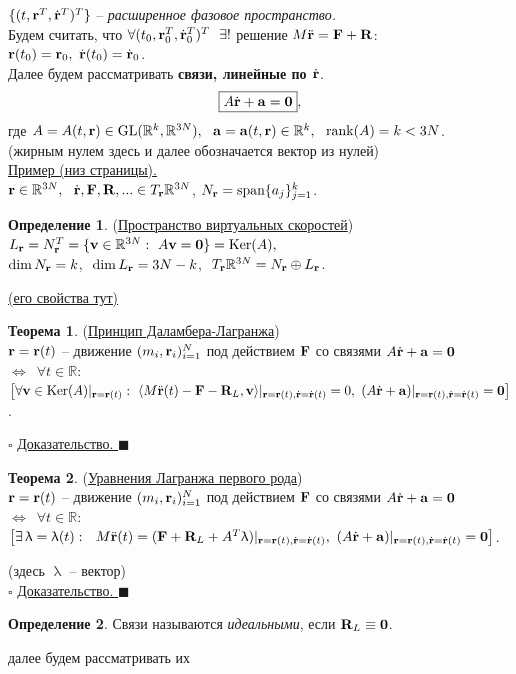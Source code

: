 \documentclass[specialist, subf, href, colorlinks=true, 12pt, times, mtpro, final]{disser}
\theoremstyle{definition}
\newtheorem{defn}{Определение}[section]
\newtheorem{theorem}{Теорема}[section]
\def\note{\textcolor{faded}}
\def\rk{\text{rank}}
\def\span{\text{span}}
\def\bfrd{\dot{\bfr}}
\def\bfrdd{\ddot{\bfr}}
\def\bfzero{\mathbf{0}}
\begin{document}
    $\{(t, \bfr^T, \bfrd^T)^T\}$ -- {\it расширенное фазовое пространство.}\\
    Будем считать, что $\forall (t_0, \bfr_0^T, \bfrd_0^T)^T \ \ \exists!$ решение
    $M\bfrdd = \bfF + \bfR$:\\ $\bfr(t_0) = \bfr_0,\ \bfrd(t_0) = \bfrd_0$.\\
    Далее будем рассматривать {\bf связи, линейные по $\bfrd$}.
    $$
    \boxed{
    A\bfrd + \bfa = \bfzero},
    $$
    где $A=A(t,\bfr)\in\text{GL}(\mathbb{R}^k, \mathbb{R}^{3N}),\ \ \bfa=\bfa(t,\bfr)\in\mathbb{R}^k,\ \ \rk(A) = k < 3N$.\\
    \note{(жирным нулем здесь и далее обозначается вектор из нулей)}\\
    \noindent\hyperlink{first_lects.2}{Пример (низ страницы).}\\
    $\bfr\in\mathbb{R}^{3N},\ \ \bfrd, \bfF, \bfR,... \in T_{\bfr}\mathbb{R}^{3N}$,
    $N_{\bfr} = \span\{a_j\}_{j=1}^k$.
    \begin{defn} (\hyperlink{first_lects.3}{Пространство виртуальных скоростей})\\
    $L_{\bfr} = N_{\bfr}^T = \{\bfv\in\mathbb{R}^{3N}:\ A\bfv=\bfzero\} = \text{Ker}(A),$\\
    $\dim N_{\mathbf{r}} = k$,\,\, $\dim L_{\mathbf{r}} = 3N-k$,\,\,  $T_{\mathbf{r}}\mathbb{R}^{3N} = N_{\mathbf{r}}\oplus L_{\mathbf{r}}$.
    \end{defn}
    \noindent\hyperlink{first_lects.3}{(его свойства тут)}
    \begin{theorem} (\hyperlink{first_lects.3}{Принцип Даламбера-Лагранжа})\\
    $\mathbf{r}=\mathbf{r}(t)$ -- движение $(m_i, \mathbf{r}_i)_{i=1}^N$ под действием $\mathbf{F}$ со
    связями $A\bfrd+\bfa=\bfzero$ $\Longleftrightarrow\,\,\,\forall t\in\mathbb{R}:\,$\\
    $\left[ \forall\bfv\in\text{Ker}(A)|_{\bfr=\bfr(t)}:\ \langle M\bfrdd(t)-\bfF-\bfR_L,\bfv\rangle
    |_{\bfr=\bfr(t),\bfrd=\bfrd(t)} = 0,\,\,(A\bfrd+\bfa)|_{\bfr=\bfr(t),\bfrd=\bfrd(t)}=\bfzero \right]$.
    \end{theorem}
    \noindent$\square$ \hyperlink{first_lects.4}{ Доказательство. } $\blacksquare$
    \begin{theorem} (\hyperlink{first_lects.5}{Уравнения Лагранжа первого рода})\\
    $\mathbf{r}=\mathbf{r}(t)$ -- движение $(m_i, \mathbf{r}_i)_{i=1}^N$ под действием $\mathbf{F}$ со
    связями $A\bfrd+\bfa=\bfzero$ $\Longleftrightarrow\,\,\,\forall t\in\mathbb{R}:\,$\\
    $\left[ \exists\,\uplambda=\uplambda(t):\ \ M\bfrdd(t)=(\bfF+\bfR_L+A^T\uplambda)|_{\bfr=\bfr(t),\bfrd=\bfrd(t)},\,\,(A\bfrd+\bfa)|_{\bfr=\bfr(t),\bfrd=\bfrd(t)}=\bfzero \right]$.
    \end{theorem}
    \noindent\note{(здесь $\uplambda$ -- вектор)}\\
    \noindent$\square$ \hyperlink{first_lects.6}{ Доказательство. } $\blacksquare$
    \begin{defn}
    Связи называются {\it идеальными}, если $\bfR_L \equiv \bfzero$.
    \end{defn}
    \note{далее будем рассматривать их}
    
\end{document}
